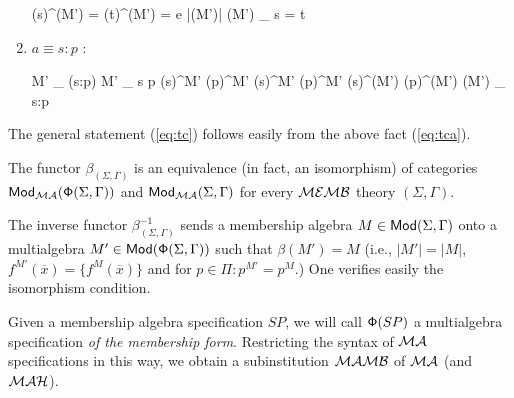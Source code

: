 \documentclass[10pt]{article}
\begin{document}
\begin{PROOF}
\begin{enumerate}
\begin{eqp}
			{\nu}(s)^{\beta(M')} = {\nu}(t)^{\beta(M')} = e \in |\beta(M')|
			{\beta(M')} \models_{\nu} s = t
		\end{eqp}
\item $a\equiv s:p$ :
		\begin{eqp}
			M' \models_{\nu} \alpha(s:p)
			M' \models_{\nu} s \prec p
			{\nu}(s)^{M'} \subseteq {\nu}(p)^{M'}
			{\nu}(s)^{M'} \in {\nu}(p)^{M'}
			{\nu}(s)^{\beta(M')} \in {\nu}(p)^{\beta(M')}
			{\beta(M')} \models_{\nu} s:p
		\end{eqp}
	\end{enumerate}
The general statement (\ref{eq:tc}) follows easily from the above fact (\ref{eq:tca}).
\end{PROOF}

\begin{fact}
The functor $\beta_{(\Sigma,\Gamma)}$ is an equivalence (in fact, an
isomorphism) of categories ${\sf {Mod}}_{{\mathcal{MA}}}({\sf {\Phi}}(\Sigma,\Gamma))$ and
${\sf {Mod}}_{{\mathcal{MA}}}(\Sigma,\Gamma)$ for
every ${\mathcal{MEMB}}$ theory $(\Sigma,\Gamma)$. 
\end{fact}

\begin{PROOF}
The inverse functor
$\beta^{-1}_{(\Sigma,\Gamma)}$ sends a membership algebra
$M\in{\sf {Mod}}(\Sigma,\Gamma)$ onto a multialgebra
$M'\in{\sf {Mod}}({\sf {\Phi}}(\Sigma,\Gamma))$ such that $\beta(M')=M$ (i.e., $|M'|=|M|$,
$f^{M'}(\overline x) = \{f^M(\overline x)\}$ and for $p\in\Pi:p^{M'}=p^M$.)
One verifies easily the isomorphism condition.
\end{PROOF}
%
Given a membership algebra specification $SP$, we will call ${\sf {\Phi}}(SP)$ a
multialgebra specification {\em of the membership form}. Restricting the syntax
of ${\mathcal{MA}}$ specifications in this way, we obtain a 
subinstitution ${\mathcal{MAMB}}$ of ${\mathcal{MA}}$ (and ${\mathcal{MAH}}$).
\end{document}
